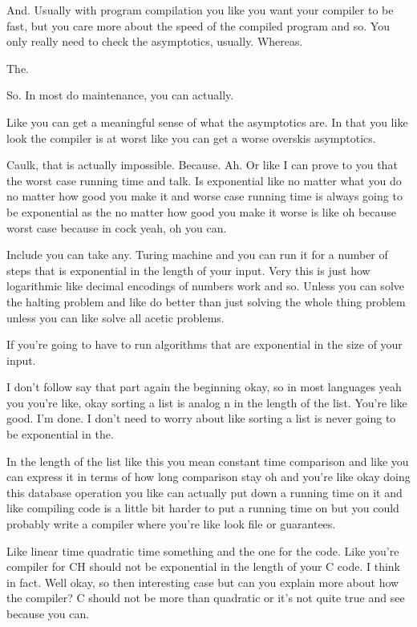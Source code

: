 \begin{subappendices}
    And. Usually with program compilation you like you want your compiler to be fast, but you care more about the speed of the compiled program and so. You only really need to check the asymptotics, usually. Whereas. 
    
    The. 
    
    So. In most do maintenance, you can actually. 
    
    Like you can get a meaningful sense of what the asymptotics are. In that you like look the compiler is at worst like you can get a worse overskis asymptotics. 
    
    Caulk, that is actually impossible. Because. Ah. Or like I can prove to you that the worst case running time and talk. Is exponential like no matter what you do no matter how good you make it and worse case running time is always going to be exponential as the no matter how good you make it worse is like oh because worst case because in cock yeah, oh you can. 
    
    Include you can take any. Turing machine and you can run it for a number of steps that is exponential in the length of your input. Very this is just how logarithmic like decimal encodings of numbers work and so. Unless you can solve the halting problem and like do better than just solving the whole thing problem unless you can like solve all acetic problems. 
    
    If you're going to have to run algorithms that are exponential in the size of your input. 
    
    I don't follow say that part again the beginning okay, so in most languages yeah you you're like, okay sorting a list is analog n in the length of the list. You're like good. I'm done. I don't need to worry about like sorting a list is never going to be exponential in the. 
    
    In the length of the list like this you mean constant time comparison and like you can express it in terms of how long comparison stay oh and you're like okay doing this database operation you like can actually put down a running time on it and like compiling code is a little bit harder to put a running time on but you could probably write a compiler where you're like look file or guarantees. 
    
    Like linear time quadratic time something and the one for the code. Like you're compiler for CH should not be exponential in the length of your C code. I think in fact. Well okay, so then interesting case but can you explain more about how the compiler? C should not be more than quadratic or it's not quite true and see because you can. 
    

\end{subappendices}
